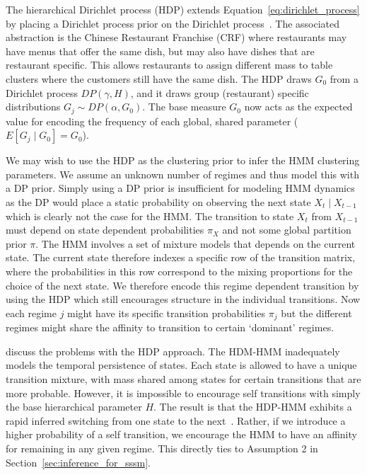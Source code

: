 The hierarchical Dirichlet process (HDP) extends Equation~\ref{eq:dirichlet_process} by placing a Dirichlet process prior on the Dirichlet process~\citep{teh2005sharing}. The associated abstraction is the Chinese Restaurant Franchise (CRF) where restaurants may have menus that offer the same dish, but may also have dishes that are restaurant specific. This allows restaurants to assign different mass to table clusters where the customers still have the same dish. The HDP draws $G_0$ from a Dirichlet process $DP(\gamma, H)$, and it draws group (restaurant) specific distributions $G_j \sim DP(\alpha, G_0)$. The base measure $G_0$ now acts as the expected value for encoding the frequency of each global, shared parameter ($E[G_j \mid G_0] = G_0$).

We may wish to use the HDP as the clustering prior to infer the HMM clustering parameters. We assume an unknown number of regimes and thus model this with a DP prior. Simply using a DP prior is insufficient for modeling HMM dynamics as the DP would place a static probability on observing the next state $X_t \mid X_{t-1}$ which is clearly not the case for the HMM. The transition to state $X_t$ from $X_{t-1}$ must depend on state dependent probabilities $\pi_X$ and not some global partition prior $\pi$. The HMM involves a set of mixture models that depends on the current state. The current state therefore indexes a specific row of the transition matrix, where the probabilities in this row correspond to the mixing proportions for the choice of the next state. We therefore encode this regime dependent transition by using the HDP which still encourages structure in the individual transitions. Now each regime $j$ might have its specific transition probabilities $\pi_j$ but the different regimes might share the affinity to transition to certain `dominant' regimes.

\cite{fox2009nonparametric, fox2007hierarchical} discuss the problems with the HDP approach. The HDM-HMM inadequately models the temporal persistence of states. Each state is allowed to have a unique transition mixture, with mass shared among states for certain transitions that are more probable. However, it is impossible to encourage self transitions with simply the base hierarchical parameter $H$. The result is that the HDP-HMM exhibits a rapid inferred switching from one state to the next~\citep{fox2007hierarchical}. Rather, if we introduce a higher probability of a self transition, we encourage the HMM to have an affinity for remaining in any given regime. This directly ties to Assumption 2 in Section~\ref{sec:inference_for_sssm}.

